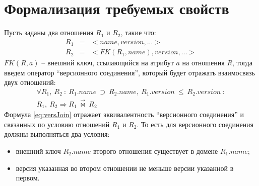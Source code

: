 \section{Формализация требуемых свойств}
\indent Пусть заданы два отношения $R_1$ и $R_2$, такие что:
\begin{eqnarray*}
	R_1 & = & <name, version, ...> \\
	R_2 & = & <FK(R_1, name), version, ...>
\end{eqnarray*}
\indent $FK(R, a)$ -- внешний ключ, ссылающийся на атрибут $a$ на отношения $R$, тогда введем оператор ``версионного соединения'', который будет отражать взаимосвязь двух отношений:
\begin{multline}
	\label{eq:versJoin}
	\forall R_1,\ R_2\ :\ R_1.name\ \supset\ R_2.name,\ R_1.version\ \leq\ R_2.version\ :\\
	R_1,\ R_2 \Rightarrow R_1\ \overrightarrow{\bowtie}\ R_2\
\end{multline}
\indent Формула \ref{eq:versJoin} отражает эквивалентность ``версионного соединения'' и связанных по условию отношений $R_1$ и $R_2$.
То есть для версионного соединения должны выполняться два условия:
\begin{itemize}
	\item внешний ключ $R_2.name$ второго отношения существует в домене $R_1.name$;
	\item версия указанная во втором отношении не меньше версии указанной в первом.
\end{itemize}

